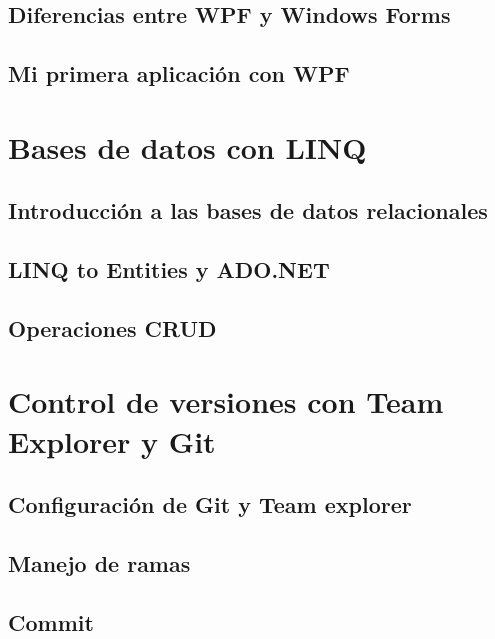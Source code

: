\documentclass[12pt,a4paper]{report}
\begin{document}
\section{Diferencias entre WPF y Windows Forms}
\section{Mi primera aplicación con WPF}

\chapter{Bases de datos con LINQ}
\section{Introducción a las bases de datos relacionales}
\section{LINQ to Entities y ADO.NET}
\section{Operaciones CRUD}

\chapter{Control de versiones con Team Explorer y Git}
\section{Configuración de Git y Team explorer}
\section{Manejo de ramas}
\section{Commit}
\end{document}
